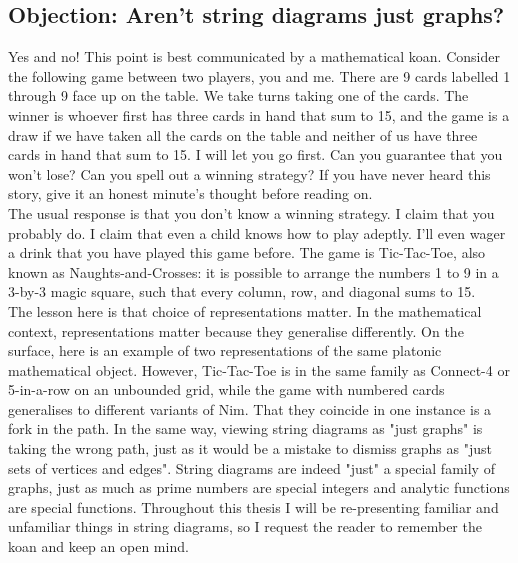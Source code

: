 \begin{fullwidth}
\begin{multicols}{2}
\subsection{\textbf{Objection:} Aren't string diagrams just graphs?}

Yes and no! This point is best communicated by a mathematical koan. Consider the following game between two players, you and me. There are 9 cards labelled 1 through 9 face up on the table. We take turns taking one of the cards. The winner is whoever first has three cards in hand that sum to 15, and the game is a draw if we have taken all the cards on the table and neither of us have three cards in hand that sum to 15. I will let you go first. Can you guarantee that you won't lose? Can you spell out a winning strategy? If you have never heard this story, give it an honest minute's thought before reading on.\\

The usual response is that you don't know a winning strategy. I claim that you probably do. I claim that even a child knows how to play adeptly. I'll even wager a drink that you have played this game before. The game is Tic-Tac-Toe, also known as Naughts-and-Crosses: it is possible to arrange the numbers 1 to 9 in a 3-by-3 magic square, such that every column, row, and diagonal sums to 15.\\

The lesson here is that choice of representations matter. In the mathematical context, representations matter because they generalise differently. On the surface, here is an example of two representations of the same platonic mathematical object. However, Tic-Tac-Toe is in the same family as Connect-4 or 5-in-a-row on an unbounded grid, while the game with numbered cards generalises to different variants of Nim. That they coincide in one instance is a fork in the path. In the same way, viewing string diagrams as "just graphs" is taking the wrong path, just as it would be a mistake to dismiss graphs as "just sets of vertices and edges". String diagrams are indeed "just" a special family of graphs, just as much as prime numbers are special integers and analytic functions are special functions. Throughout this thesis I will be re-presenting familiar and unfamiliar things in string diagrams, so I request the reader to remember the koan and keep an open mind.\\


\end{multicols}
\end{fullwidth}
